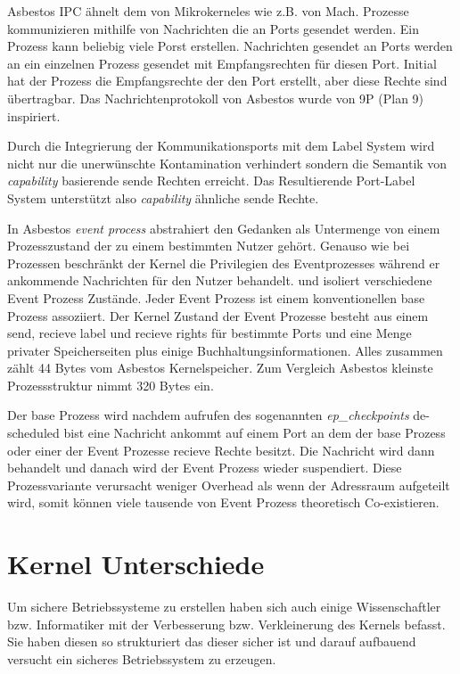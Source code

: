 \documentclass[9pt,technote]{IEEEtran}
\begin{document}
      Asbestos IPC \"ahnelt dem von Mikrokerneles wie z.B. von Mach. Prozesse kommunizieren mithilfe von Nachrichten die an Ports gesendet werden. Ein Prozess kann
      beliebig viele Porst erstellen. Nachrichten gesendet an Ports werden an ein einzelnen Prozess gesendet mit Empfangsrechten f\"ur diesen Port. Initial hat der Prozess
      die Empfangsrechte der den Port erstellt, aber diese Rechte sind \"ubertragbar. Das Nachrichtenprotokoll von Asbestos wurde von 9P (Plan 9) inspiriert.
      
      
      Durch die Integrierung der Kommunikationsports mit dem Label System wird nicht nur die unerw\"unschte Kontamination verhindert sondern die Semantik von \textit{capability} basierende
      sende Rechten erreicht. Das Resultierende Port-Label System unterst\"utzt also \textit{capability} \"ahnliche sende Rechte.
      
      In Asbestos \textit{event process} abstrahiert den Gedanken als Untermenge von einem Prozesszustand der zu einem bestimmten Nutzer geh\"ort. Genauso wie bei Prozessen beschr\"ankt der Kernel
      die Privilegien des Eventprozesses w\"ahrend er ankommende Nachrichten f\"ur den Nutzer behandelt. und isoliert verschiedene Event Prozess Zust\"ande.
      Jeder Event Prozess ist einem konventionellen base Prozess assoziiert. Der Kernel Zustand der Event Prozesse besteht aus einem send, recieve label und recieve rights f\"ur bestimmte Ports
      und eine Menge privater Speicherseiten plus einige Buchhaltungsinformationen. Alles zusammen z\"ahlt 44 Bytes vom Asbestos Kernelspeicher. Zum Vergleich Asbestos kleinste Prozessstruktur
      nimmt 320 Bytes ein. 
      
      Der base Prozess wird nachdem aufrufen des sogenannten \textit{ep\_checkpoints} de-scheduled bist eine Nachricht ankommt auf einem Port an dem der base Prozess oder einer der
      Event Prozesse recieve Rechte besitzt. Die Nachricht wird dann behandelt und danach wird der Event Prozess wieder suspendiert.
      Diese Prozessvariante verursacht weniger Overhead als wenn der Adressraum aufgeteilt wird, somit k\"onnen viele tausende von Event Prozess theoretisch Co-existieren.
      
     
        
   
  \section{Kernel Unterschiede} \label{sec:kernel}
    Um sichere Betriebssysteme zu erstellen haben sich auch einige Wissenschaftler bzw. Informatiker mit der Verbesserung bzw. Verkleinerung
    des Kernels befasst. Sie haben diesen so strukturiert das dieser sicher ist und darauf aufbauend versucht ein sicheres Betriebssystem zu erzeugen.
    
   \nocite{*}     


\end{document}
